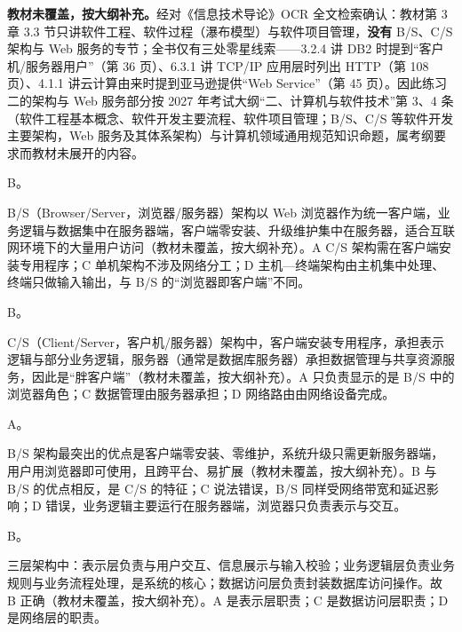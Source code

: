 \documentclass[a4paper,11pt]{article}
\begin{document}

\textbf{教材未覆盖，按大纲补充。}经对《信息技术导论》OCR 全文检索确认：教材第 3 章 3.3 节只讲软件工程、软件过程（瀑布模型）与软件项目管理，\textbf{没有} B/S、C/S 架构与 Web 服务的专节；全书仅有三处零星线索——3.2.4 讲 DB2 时提到“客户机/服务器用户”（第 36 页）、6.3.1 讲 TCP/IP 应用层时列出 HTTP（第 108 页）、4.1.1 讲云计算由来时提到亚马逊提供“Web Service”（第 45 页）。因此练习二的架构与 Web 服务部分按 2027 年考试大纲“二、计算机与软件技术”第 3、4 条（软件工程基本概念、软件开发主要流程、软件项目管理；B/S、C/S 等软件开发主要架构，Web 服务及其体系架构）与计算机领域通用规范知识命题，属考纲要求而教材未展开的内容。\par\vspace{0.6em}


\q B。\begin{analysis}B/S（Browser/Server，浏览器/服务器）架构以 Web 浏览器作为统一客户端，业务逻辑与数据集中在服务器端，客户端零安装、升级维护集中在服务器，适合互联网环境下的大量用户访问（教材未覆盖，按大纲补充）。A C/S 架构需在客户端安装专用程序；C 单机架构不涉及网络分工；D 主机—终端架构由主机集中处理、终端只做输入输出，与 B/S 的“浏览器即客户端”不同。\end{analysis}

\q B。\begin{analysis}C/S（Client/Server，客户机/服务器）架构中，客户端安装专用程序，承担表示逻辑与部分业务逻辑，服务器（通常是数据库服务器）承担数据管理与共享资源服务，因此是“胖客户端”（教材未覆盖，按大纲补充）。A 只负责显示的是 B/S 中的浏览器角色；C 数据管理由服务器承担；D 网络路由由网络设备完成。\end{analysis}

\q A。\begin{analysis}B/S 架构最突出的优点是客户端零安装、零维护，系统升级只需更新服务器端，用户用浏览器即可使用，且跨平台、易扩展（教材未覆盖，按大纲补充）。B 与 B/S 的优点相反，是 C/S 的特征；C 说法错误，B/S 同样受网络带宽和延迟影响；D 错误，业务逻辑主要运行在服务器端，浏览器只负责表示与交互。\end{analysis}

\q B。\begin{analysis}三层架构中：表示层负责与用户交互、信息展示与输入校验；业务逻辑层负责业务规则与业务流程处理，是系统的核心；数据访问层负责封装数据库访问操作。故 B 正确（教材未覆盖，按大纲补充）。A 是表示层职责；C 是数据访问层职责；D 是网络层的职责。\end{analysis}
\end{document}
